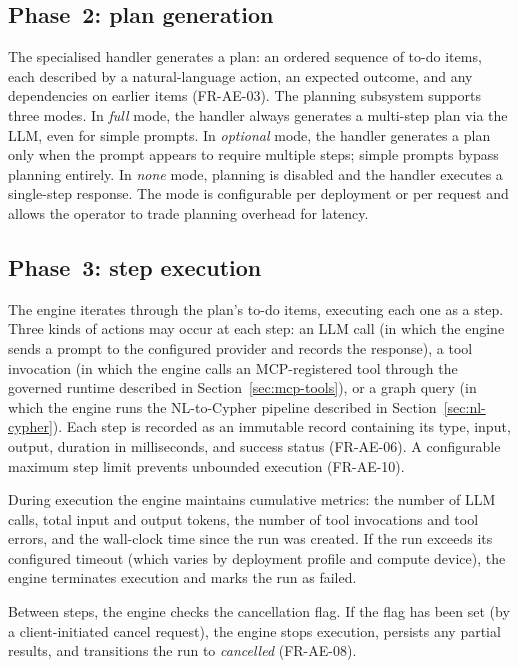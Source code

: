 \documentclass[a4paper]{sapthesis}
\begin{document}
\subsection{Phase~2: plan generation}

The specialised handler generates a plan: an ordered sequence of to-do
items, each described by a natural-language action, an expected outcome,
and any dependencies on earlier items (FR-AE-03).  The planning subsystem
supports three modes.  In \emph{full} mode, the handler always generates
a multi-step plan via the LLM, even for simple prompts.  In
\emph{optional} mode, the handler generates a plan only when the prompt
appears to require multiple steps; simple prompts bypass planning
entirely.  In \emph{none} mode, planning is disabled and the handler
executes a single-step response.  The mode is configurable per deployment
or per request and allows the operator to trade planning overhead for
latency.

\subsection{Phase~3: step execution}

The engine iterates through the plan's to-do items, executing each one as
a step.  Three kinds of actions may occur at each step: an LLM call (in
which the engine sends a prompt to the configured provider and records the
response), a tool invocation (in which the engine calls an MCP-registered
tool through the governed runtime described in
Section~\ref{sec:mcp-tools}), or a graph query (in which the engine runs
the NL-to-Cypher pipeline described in Section~\ref{sec:nl-cypher}).  Each
step is recorded as an immutable record containing its type, input, output,
duration in milliseconds, and success status (FR-AE-06).  A configurable
maximum step limit prevents unbounded execution (FR-AE-10).

During execution the engine maintains cumulative metrics: the number of
LLM calls, total input and output tokens, the number of tool invocations
and tool errors, and the wall-clock time since the run was created.  If
the run exceeds its configured timeout (which varies by deployment
profile and compute device), the engine terminates execution and marks
the run as failed.

Between steps, the engine checks the cancellation flag.  If the flag has
been set (by a client-initiated cancel request), the engine stops
execution, persists any partial results, and transitions the run to
\emph{cancelled} (FR-AE-08).
\end{document}
